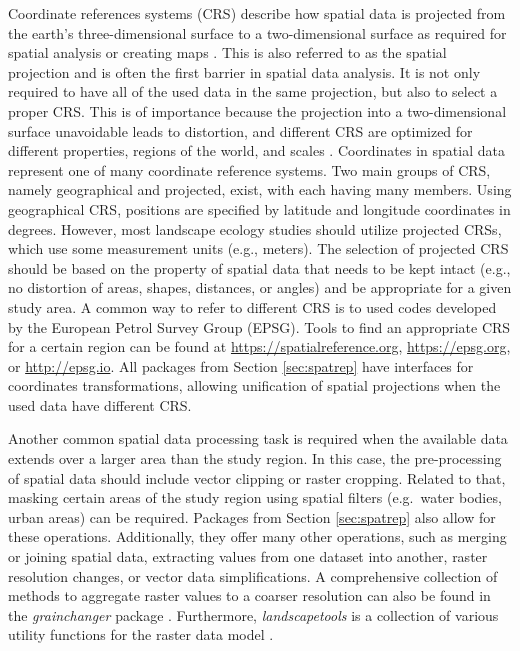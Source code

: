 \documentclass[smallextended]{svjour3}       %
\begin{document}
Coordinate references systems (CRS) describe how spatial data is projected from the earth's three-dimensional surface to a two-dimensional surface as required for spatial analysis or creating maps \cite{Lovelace2019,Pebesma2019a}.
This is also referred to as the spatial projection and is often the first barrier in spatial data analysis.
It is not only required to have all of the used data in the same projection, but also to select a proper CRS.
This is of importance because the projection into a two-dimensional surface unavoidable leads to distortion, and different CRS are optimized for different properties, regions of the world, and scales \cite{Bivand2013,Lovelace2019}.
Coordinates in spatial data represent one of many coordinate reference systems.
Two main groups of CRS, namely geographical and projected, exist, with each having many members.
Using geographical CRS, positions are specified by latitude and longitude coordinates in degrees.
However, most landscape ecology studies should utilize projected CRSs, which use some measurement units (e.g., meters).
The selection of projected CRS should be based on the property of spatial data that needs to be kept intact (e.g., no distortion of areas, shapes, distances, or angles) and be appropriate for a given study area.
A common way to refer to different CRS is to used codes developed by the European Petrol Survey Group (EPSG).
Tools to find an appropriate CRS for a certain region can be found at \url{https://spatialreference.org}, \url{https://epsg.org}, or \url{http://epsg.io}.
All packages from Section \ref{sec:spatrep} have interfaces for coordinates transformations, allowing unification of spatial projections when the used data have different CRS.

Another common spatial data processing task is required when the available data extends over a larger area than the study region.
In this case, the pre-processing of spatial data should include vector clipping or raster cropping.
Related to that, masking certain areas of the study region using spatial filters (e.g.~water bodies, urban areas) can be required.
Packages from Section \ref{sec:spatrep} also allow for these operations.
Additionally, they offer many other operations, such as merging or joining spatial data, extracting values from one dataset into another, raster resolution changes, or vector data simplifications.
A comprehensive collection of methods to aggregate raster values to a coarser resolution can also be found in the \emph{grainchanger} package \cite{Graham2019}.
Furthermore, \emph{landscapetools} is a collection of various utility functions for the raster data model \cite{Sciaini2018}.
\end{document}
